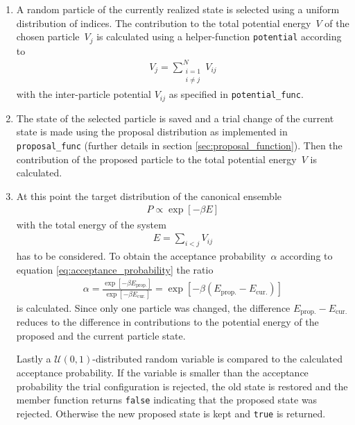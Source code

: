 \documentclass[11pt, a4paper]{article}
\numberwithin{equation}{section}
\begin{document}
\begin{enumerate}
	\item
		A random particle of the currently realized state is selected using a uniform distribution of indices.
		The contribution to the total potential energy~$V$ of the chosen particle~$V_j$ is calculated using a helper-function \texttt{potential} according to
		\begin{align*}
			V_j = \sum_{\substack{i = 1 \\ i \neq j}}^N V_{ij}
		\end{align*}
		with the inter-particle potential $V_{ij}$ as specified in \texttt{potential\_func}.
		
	\item
		The state of the selected particle is saved and a trial change of the current state is made using the proposal distribution as implemented in \texttt{proposal\_func} (further details in section \ref{sec:proposal_function}).
		Then the contribution of the proposed particle to the total potential energy~$V$ is calculated.
		
	\item
		At this point the target distribution of the canonical ensemble
		\begin{align*}
			P \propto \exp\left[ - \beta E \right]
		\end{align*}
		with the total energy of the system
		\begin{align*}
			E = \sum_{i < j} V_{ij}
		\end{align*}
		has to be considered.
		To obtain the acceptance probability~$\alpha$ according to equation \eqref{eq:acceptance_probability} the ratio
		\begin{align} \label{Eq:Prob_New_State}
			\alpha = \frac{\exp\left[ -\beta E_\mathrm{prop.} \right]}{\exp \left[ -\beta E_\mathrm{cur.} \right]} = \exp\left[ -\beta \left( E_\mathrm{prop.} - E_\mathrm{cur.} \right) \right]
		\end{align}
		is calculated.
		Since only one particle was changed, the difference $E_\mathrm{prop.} - E_\mathrm{cur.}$ reduces to the difference in contributions to the potential energy of the proposed and the current particle state.
		
		Lastly a $\mathcal{U}(0, 1)$-distributed random variable is compared to the calculated acceptance probability.
		If the variable is smaller than the acceptance probability the trial configuration is rejected, the old state is restored and the member function returns \texttt{false} indicating that the proposed state was rejected.
		Otherwise the new proposed state is kept and \texttt{true} is returned.		
\end{enumerate}
\end{document}
